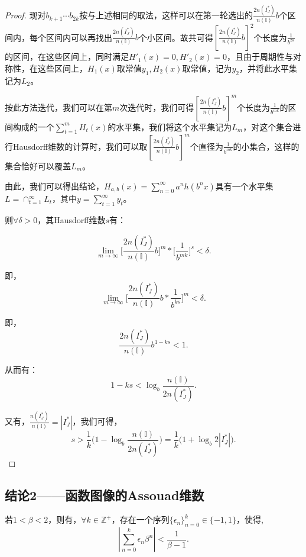 \begin{proof}
现对$b_{k+1}\cdots b_{2k}$按与上述相同的取法，这样可以在第一轮选出的$\frac{2n(I_J^*)}{n(\mathbb{I})}b$个区间内，每个区间内可以再找出$\frac{2n(I_J^*)}{n(\mathbb{I})}b$个小区间。故共可得$[\frac{2n(I_J^*)}{n(\mathbb{I})}b]^2$个长度为$\frac{1}{b^{2k}}$的区间，在这些区间上，同时满足$H'_1(x)=0,H'_2(x)=0$，且由于周期性与对称性，在这些区间上，$H_1(x)$取常值$y_1,H_2(x)$取常值，记为$y_2$，并将此水平集记为$L_2$。

按此方法迭代，我们可以在第$m$次迭代时，我们可得$[\frac{2n(I_J^*)}{n(\mathbb{I})}b]^m$个长度为$\frac{1}{b^{mk}}$的区间构成的一个$\sum_{t=1}^mH_t(x)$的水平集，我们将这个水平集记为$L_m$，对这个集合进行Hausdorff维数的计算时，我们可以取$[\frac{2n(I_J^*)}{n(\mathbb{I})}b]^m$个直径为$\frac{1}{b^{mk}}$的小集合，这样的集合恰好可以覆盖$L_m$。

由此，我们可以得出结论，$H_{a,b}(x)=\sum_{n=0}^\infty a^nh(b^nx)$具有一个水平集$L=\cap_{t=1}^\infty L_t$，其中$y=\sum_{t=1}^\infty y_t$。

则$\forall \delta>0$，其Hausdorff维数$s$有：

$$
      \lim_{m\rightarrow\infty}\Big[\frac{2n(I_J^*)}{n(\mathbb{I})}b\Big]^m*\Big[\frac{1}{b^{mk}}\Big]^s<\delta.
$$

即，
$$
      \lim_{m\rightarrow\infty}\Big[\frac{2n(I_J^*)}{n(\mathbb{I})}b*\frac{1}{b^{ks}}\Big]^m<\delta.
$$

即，
$$
      \frac{2n(I_J^*)}{n(\mathbb{I})}b^{1-ks}<1.
$$

从而有：
$$
      1-ks<\log_b\frac{n(\mathbb{I})}{2n(I_J^*)}.
$$

又有，$\frac{n(I_J^*)}{n(\mathbb{I})}=|I_J^*|$，我们可得，
$$
      s>\frac{1}{k}\Big(1-\log_b\frac{n(\mathbb{I})}{2n(I_J^*)}\Big)=\frac{1}{k}\Big(1+\log_b2|I_J^*|\Big).
$$

\end{proof}

\subsection{结论2——函数图像的Assouad维数}

\begin{lemma}
      若$1<\beta<2$，则有，$\forall k\in\mathbb{Z}^+$，存在一个序列$\{\epsilon_n\}_{n=0}^k\in\{-1,1\}$，使得,
      $$
            |\sum_{n=0}^k\epsilon_n\beta^n|<\frac{1}{\beta-1}.
      $$
\end{lemma}


